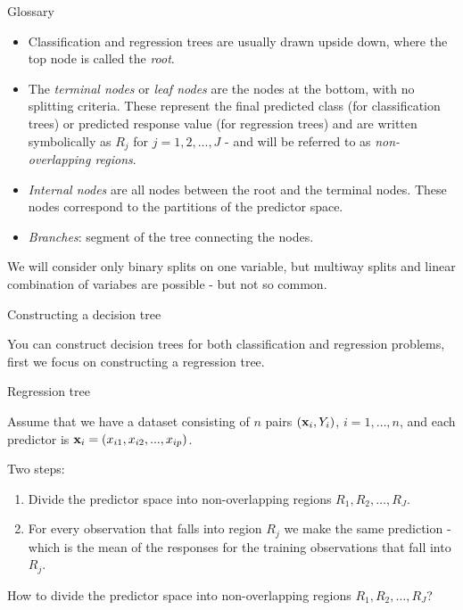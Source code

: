 \documentclass[ignorenonframetext,]{beamer}
\providecommand{\tightlist}{%
  \setlength{\itemsep}{0pt}\setlength{\parskip}{0pt}}
\begin{document}
\begin{frame}

\begin{block}{Glossary}

\begin{itemize}
\tightlist
\item
  Classification and regression trees are usually drawn upside down,
  where the top node is called the \emph{root}.
\item
  The \emph{terminal nodes} or \emph{leaf nodes} are the nodes at the
  bottom, with no splitting criteria. These represent the final
  predicted class (for classification trees) or predicted response value
  (for regression trees) and are written symbolically as \(R_j\) for
  \(j = 1, 2, ..., J\) - and will be referred to as
  \emph{non-overlapping regions}.
\item
  \emph{Internal nodes} are all nodes between the root and the terminal
  nodes. These nodes correspond to the partitions of the predictor
  space.
\item
  \emph{Branches}: segment of the tree connecting the nodes.
\end{itemize}

We will consider only binary splits on one variable, but multiway splits
and linear combination of variabes are possible - but not so common.

\end{block}

\end{frame}

\begin{frame}{Constructing a decision tree}

You can construct decision trees for both classification and regression
problems, first we focus on constructing a regression tree.

\begin{block}{Regression tree}

Assume that we have a dataset consisting of \(n\) pairs
\(({\bf x}_i,Y_i)\), \(i=1,\ldots,n\), and each predictor is
\({\bf x}_i=(x_{i1},x_{i2},...,x_{ip})\).

Two steps:

\begin{enumerate}
\def\labelenumi{\arabic{enumi}.}
\tightlist
\item
  Divide the predictor space into non-overlapping regions
  \(R_1,R_2,\ldots,R_J\).
\item
  For every observation that falls into region \(R_j\) we make the same
  prediction - which is the mean of the responses for the training
  observations that fall into \(R_j\).
\end{enumerate}

How to divide the predictor space into non-overlapping regions
\(R_1,R_2,\ldots,R_J\)?

\end{block}

\end{frame}
\end{document}
